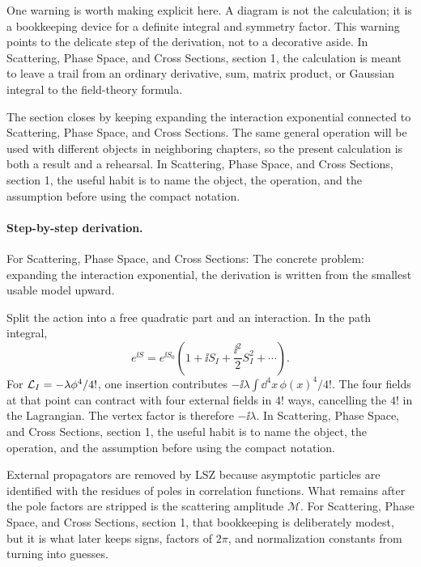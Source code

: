 One warning is worth making explicit here.  A diagram is not the calculation; it is a bookkeeping device for a definite integral and symmetry factor.  This warning points to the delicate step of the derivation, not to a decorative aside.  In Scattering, Phase Space, and Cross Sections, section 1, the calculation is meant to leave a trail from an ordinary derivative, sum, matrix product, or Gaussian integral to the field-theory formula.

The section closes by keeping expanding the interaction exponential connected to Scattering, Phase Space, and Cross Sections.  The same general operation will be used with different objects in neighboring chapters, so the present calculation is both a result and a rehearsal.  In Scattering, Phase Space, and Cross Sections, section 1, the useful habit is to name the object, the operation, and the assumption before using the compact notation.



\paragraph{Step-by-step derivation.}

For Scattering, Phase Space, and Cross Sections: The concrete problem: expanding the interaction exponential, the derivation is written from the smallest usable model upward.

Split the action into a free quadratic part and an interaction.  In the path integral,
\[
  e^{\ii S}=e^{\ii S_0}\left(1+\ii S_I+\frac{\ii^2}{2}S_I^2+\cdots\right).
\]
For \(\mathcal L_I=-\lambda\phi^4/4!\), one insertion contributes \(-\ii\lambda\int\dd^4x\,\phi(x)^4/4!\).  The four fields at that point can contract with four external fields in \(4!\) ways, cancelling the \(4!\) in the Lagrangian.  The vertex factor is therefore \(-\ii\lambda\).  In Scattering, Phase Space, and Cross Sections, section 1, the useful habit is to name the object, the operation, and the assumption before using the compact notation.

External propagators are removed by LSZ because asymptotic particles are identified with the residues of poles in correlation functions.  What remains after the pole factors are stripped is the scattering amplitude \(\mathcal M\).  For Scattering, Phase Space, and Cross Sections, section 1, that bookkeeping is deliberately modest, but it is what later keeps signs, factors of \(2\pi\), and normalization constants from turning into guesses.

